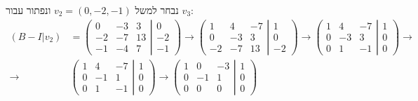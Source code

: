 \documentclass{article}
\begin{document}
נבחר למשל $v_2=(0, -2, -1)$ ונפתור עבור $v_3$:
\begin{align*}
    (B-I | v_2) & =
    \left(
    \begin{matrix}
        0  & -3 & 3  \\
        -2 & -7 & 13 \\
        -1 & -4 & 7
    \end{matrix}
    \left|
    \begin{matrix}
        0  \\
        -2 \\
        -1
    \end{matrix}
    \right.
    \right)\rightarrow
    \left(
    \begin{matrix}
        1  & 4  & -7 \\
        0  & -3 & 3  \\
        -2 & -7 & 13
    \end{matrix}
    \left|
    \begin{matrix}
        1 \\
        0 \\
        -2
    \end{matrix}
    \right.
    \right)\rightarrow
    \left(
    \begin{matrix}
        1 & 4  & -7 \\
        0 & -3 & 3  \\
        0 & 1  & -1
    \end{matrix}
    \left|
    \begin{matrix}
        1 \\
        0 \\
        0
    \end{matrix}
    \right.
    \right)\rightarrow \\
    \rightarrow &
    \left(
    \begin{matrix}
        1 & 4  & -7 \\
        0 & -1 & 1  \\
        0 & 1  & -1
    \end{matrix}
    \left|
    \begin{matrix}
        1 \\
        0 \\
        0
    \end{matrix}
    \right.
    \right)\rightarrow
    \left(
    \begin{matrix}
        1 & 0  & -3 \\
        0 & -1 & 1  \\
        0 & 0  & 0
    \end{matrix}
    \left|
    \begin{matrix}
        1 \\
        0 \\
        0
    \end{matrix}
    \right.
    \right)
\end{align*}
\end{document}
